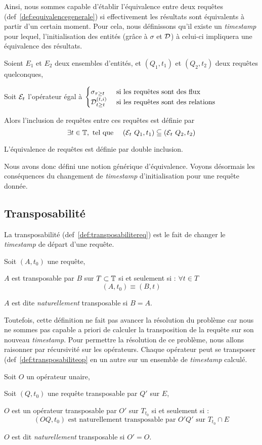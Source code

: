 Ainsi, nous sommes capable d'établir l'équivalence entre deux requêtes (def~\ref{def:equivalencegenerale}) si effectivement les résultats sont équivalents à partir d'un certain moment. Pour cela, nous définissons qu'il existe un \textit{timestamp} pour lequel, l'initialisation des entités (grâce à $\sigma$ et $\mathcal{D}$) à celui-ci impliquera une équivalence des résultats.
\begin{defi}\label{def:equivalencegenerale}
    Soient $E_1$ et $E_2$ deux ensembles d'entités, et $(Q_1,t_1)$ et $(Q_2,t_2)$ deux requêtes quelconques,

    Soit $\mathcal{E}_t$ l'opérateur égal à $\begin{cases} \sigma_{\tau\geq t} & \textrm{ si les requêtes sont des flux}\\ \mathcal{D}_{t\geq t}^{(t,i)} & \textrm{  si les requêtes sont des relations}\end{cases}$

    Alors l'inclusion de requêtes entre ces requêtes est définie par $$\exists t \in \mathbb{T}, \textrm{ tel que } \quad (\mathcal{E}_t\ Q_1, t_1) \subseteqq (\mathcal{E}_t\  Q_2, t_2)$$

    L'équivalence de requêtes est définie par double inclusion.
\end{defi}

Nous avons donc défini une notion générique d'équivalence. Voyons désormais les conséquences du changement de \textit{timestamp} d'initialisation pour une requête donnée.
\subsection{Transposabilité}
La transposabilité (def~\ref{def:transposabilitereq}) est le fait de changer le \textit{timestamp} de départ d'une requête.
\begin{defi}\label{def:transposabilitereq}
    Soit $(A,t_0)$ une requête,

    $A$ est transposable par $B$ sur $T\subset \mathbb{T}$ si et seulement si : $\forall t\in T$ $$(A,t_0) \equiv (B,t)$$

    $A$ est dite \textit{naturellement} transposable si $B=A$.
\end{defi}
Toutefois, cette définition ne fait pas avancer la résolution du problème car nous ne sommes pas capable a priori de calculer la transposition de la requête sur son nouveau \textit{timestamp}. Pour permettre la résolution de ce problème, nous allons raisonner par récursivité sur les opérateurs. Chaque opérateur peut se transposer (def~\ref{def:transposabiliteop} en un autre sur un ensemble de \textit{timestamp} calculé.
\begin{defi}\label{def:transposabiliteop}
    Soit $O$ un opérateur unaire,

    Soit $(Q,t_0)$ une requête transposable par $Q'$ sur $E$,

    $O$ est un opérateur transposable par $O'$ sur $T_{t_0}$ si et seulement si : $$(OQ,t_0) \textrm{ est naturellement transposable par } O'Q' \textrm{ sur } T_{t_0}\cap E$$

    $O$ est dit \textit{naturellement} transposable si $O'=O$.
\end{defi}

